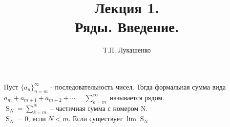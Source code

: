 \documentclass[12pt, oneside, a4paper]{book}
\begin{document}
\begin{titlepage}
\author{Т.П. Лукашенко}
\title{Лекция 1. \\Ряды. Введение.}
\date{}
\maketitle
\end{titlepage}
Пуст $ \{ a_n \}_{n=m}^{\infty} $ - последовательность чисел.
Тогда формальная сумма вида $a_m+a_{m+1}+a_{m+2}+ \cdots = \sum_{k=m}^{\infty} $ называется рядом. \\
$ \mathbin{S}_{N} = \sum_{k=m}^{N} $ -- частичная сумма с номером N.\\
$ \mathbin{S}_{N} = 0 $, если $ N < m $.
Если существует $ \lim \mathbin{S}_N $
\end{document}
